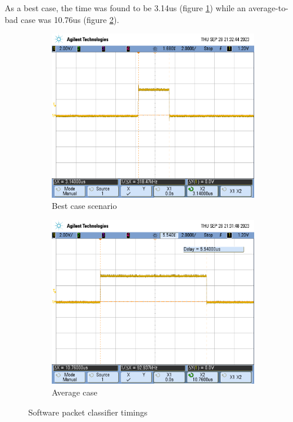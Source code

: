As a best case, the time was found to be 3.14us (figure \ref{fig:sw_pf_best_case}) while an average-to-bad case was 10.76us (figure \ref{fig:sw_pf_bad_case}).



\begin{figure}[h]
    \centering
    \begin{subfigure}[b]{0.45\textwidth} %
        \includegraphics[width=\textwidth]{Images/sw_pf_best_case.png}
        \caption{Best case scenario}
        \label{fig:sw_pf_best_case}
    \end{subfigure}
    \hfill %
    \begin{subfigure}[b]{0.45\textwidth} %
        \includegraphics[width=\textwidth]{Images/sw_pf_bad_case.png}
        \caption{Average case}
        \label{fig:sw_pf_bad_case}
    \end{subfigure}
    \caption{Software packet classifier timings}
    \label{fig:sw_pf_timings}
\end{figure}

